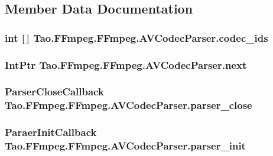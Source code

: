 \subsection{Member Data Documentation}
\hypertarget{struct_tao_1_1_f_fmpeg_1_1_f_fmpeg_1_1_a_v_codec_parser_a77d17a2f483d00e92071a97282008a1d}{
\subsubsection[{codec\_\-ids}]{\setlength{\rightskip}{0pt plus 5cm}int \mbox{[}$\,$\mbox{]} {\bf Tao.FFmpeg.FFmpeg.AVCodecParser.codec\_\-ids}}}
\label{struct_tao_1_1_f_fmpeg_1_1_f_fmpeg_1_1_a_v_codec_parser_a77d17a2f483d00e92071a97282008a1d}
\hypertarget{struct_tao_1_1_f_fmpeg_1_1_f_fmpeg_1_1_a_v_codec_parser_ac6bc4b5b6f9e7655e4641b03fc408a61}{
\subsubsection[{next}]{\setlength{\rightskip}{0pt plus 5cm}IntPtr {\bf Tao.FFmpeg.FFmpeg.AVCodecParser.next}}}
\label{struct_tao_1_1_f_fmpeg_1_1_f_fmpeg_1_1_a_v_codec_parser_ac6bc4b5b6f9e7655e4641b03fc408a61}
\hypertarget{struct_tao_1_1_f_fmpeg_1_1_f_fmpeg_1_1_a_v_codec_parser_a5a053c7777e45efcfb5f039542954e0e}{
\subsubsection[{parser\_\-close}]{\setlength{\rightskip}{0pt plus 5cm}ParserCloseCallback {\bf Tao.FFmpeg.FFmpeg.AVCodecParser.parser\_\-close}}}
\label{struct_tao_1_1_f_fmpeg_1_1_f_fmpeg_1_1_a_v_codec_parser_a5a053c7777e45efcfb5f039542954e0e}
\hypertarget{struct_tao_1_1_f_fmpeg_1_1_f_fmpeg_1_1_a_v_codec_parser_a2c31d25feb0402bfd0a0dd3a66b190ab}{
\subsubsection[{parser\_\-init}]{\setlength{\rightskip}{0pt plus 5cm}ParaerInitCallback {\bf Tao.FFmpeg.FFmpeg.AVCodecParser.parser\_\-init}}}

